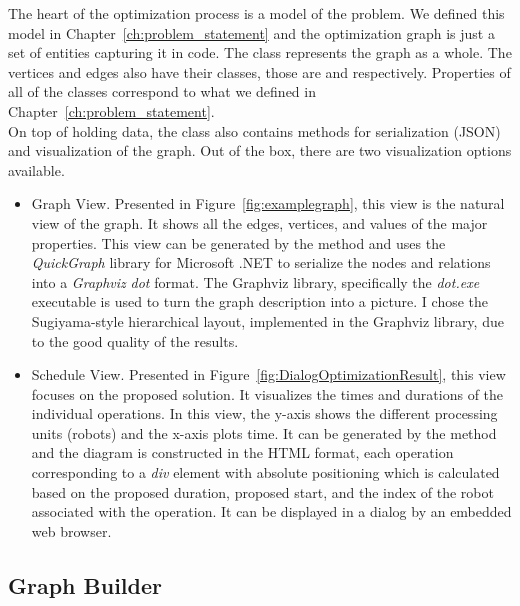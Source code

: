 The heart of the optimization process is a model of the problem.  We defined this model in Chapter~\ref{ch:problem_statement} and the optimization graph is just a set of entities capturing it in code. The  class represents the graph as a whole. The vertices and edges also have their classes, those are  and  respectively. Properties of all of the classes correspond to what we defined in Chapter~\ref{ch:problem_statement}. \\

On top of holding data, the  class also contains methods for serialization (JSON) and visualization of the graph. Out of the box, there are two visualization options available.

\begin{itemize}
    \item Graph View. Presented in Figure~\ref{fig:examplegraph}, this view is the natural view of the graph. It shows all the edges, vertices, and values of the major properties. This view can be generated by the  method and uses the \emph{QuickGraph} library for Microsoft .NET to serialize the nodes and relations into a \emph{Graphviz} \cite{Graphviz} \emph{dot} format. The Graphviz library, specifically the \emph{dot.exe} executable is used to turn the graph description into a picture. I chose the Sugiyama-style \cite{GraphvizLayout} hierarchical layout, implemented in the Graphviz library, due to the good quality of the results.

    \item Schedule View. Presented in Figure~\ref{fig:DialogOptimizationResult}, this view focuses on the proposed solution. It visualizes the times and durations of the individual operations. In this view, the y-axis shows the different processing units (robots) and the x-axis plots time. It can be generated by the  method and the diagram is constructed in the HTML format, each operation corresponding to a \emph{div} element with absolute positioning which is calculated based on the proposed duration, proposed start, and the index of the robot associated with the operation. It can be displayed in a dialog by an embedded web browser.

\end{itemize}

\subsection{Graph Builder}

